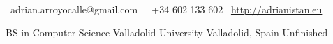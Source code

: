 \documentclass[]{awesome-cv}
\begin{document}
\begin{minipage}[b]{0.66666\textwidth}
\begin{center}
	  \\
	\vspace{2mm}
	{\faEnvelope\ adrian.arroyocalle@gmail.com} | {\faMobile\ +34 602 133 602}  {\faLink\ \url{http://adrianistan.eu}}
\end{center}
\end{minipage}

\begin{cventries}
	\cventry
	{BS in Computer Science}
	{Valladolid University}
	{Valladolid, Spain}
	{Unfinished}
	{}
\end{cventries}
\end{document}
